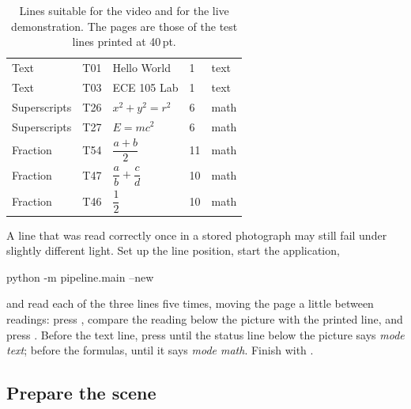 \begin{table}[H]
\centering
\begin{tabular}{C{2.3cm}C{1.3cm}C{3.3cm}C{1.3cm}C{2.0cm}}
\toprule
{} &  &  &  &  \\
\midrule
Text & T01 & Hello World & 1 & text \\
Text & T03 & ECE 105 Lab & 1 & text \\
Superscripts & T26 & $x^{2}+y^{2}=r^{2}$ & 6 & math \\
Superscripts & T27 & $E=mc^{2}$ & 6 & math \\
Fraction & T54 & $\dfrac{a+b}{2}$ & 11 & math \\[7pt]
Fraction & T47 & $\dfrac{a}{b}+\dfrac{c}{d}$ & 10 & math \\[7pt]
Fraction & T46 & $\dfrac{1}{2}$ & 10 & math \\[5pt]
\bottomrule
\end{tabular}
\caption{Lines suitable for the video and for the live demonstration. The pages are those of
the test lines printed at 40\,pt.}
\label{tab:cards}
\end{table}



\label{st:confirm}
A line that was read correctly once in a stored photograph may still fail under slightly
different light. Set up the line position, start the application,
\begin{ps}
python -m pipeline.main --new
\end{ps}
and read each of the three lines five times, moving the page a little between readings: press
, compare the reading below the picture with the printed line, and press .
Before the text line, press  until the status line below the picture says \emph{mode
text}; before the formulas, until it says \emph{mode math}. Finish with .

\subsection{Prepare the scene}

